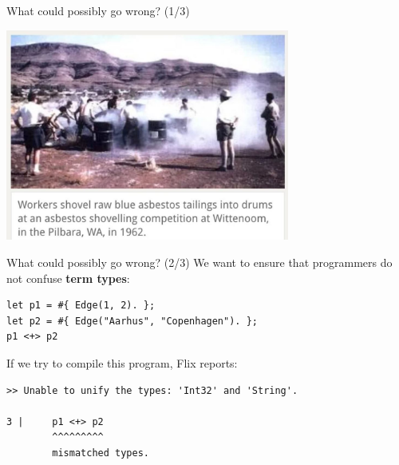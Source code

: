 \begin{frame}{What could possibly go wrong? (1/3)}
\begin{center}
    \includegraphics[width=0.7\textwidth]{img/asbestos.jpg}
\end{center}
\end{frame}  

\begin{frame}[fragile]{What could possibly go wrong? (2/3)}
We want to ensure that programmers do not confuse \textbf{term types}:

\begin{lstlisting}[language=flix, xleftmargin=0.8cm]
let p1 = #{ Edge(1, 2). };
let p2 = #{ Edge("Aarhus", "Copenhagen"). };
p1 <+> p2
\end{lstlisting}

\pause

If we try to compile this program, Flix reports:

\begin{lstlisting}[language=flix, xleftmargin=0.8cm]
>> Unable to unify the types: 'Int32' and 'String'.

3 |     p1 <+> p2
        ^^^^^^^^^
        mismatched types.
\end{lstlisting}
\end{frame}

